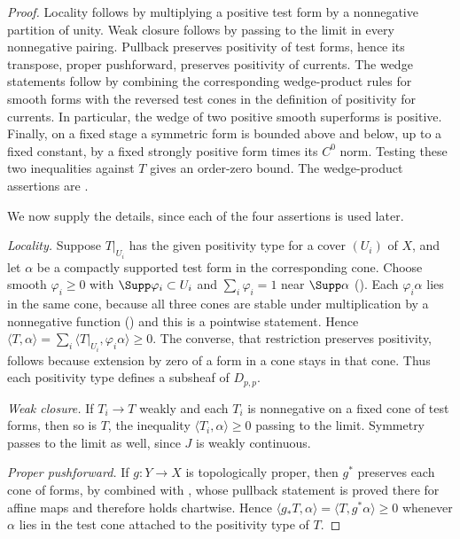 \begin{proof}
Locality follows by multiplying a positive test form by a nonnegative
partition of unity.  Weak closure follows by passing to the limit in every
nonnegative pairing.  Pullback preserves positivity of test forms, hence its
transpose, proper pushforward, preserves positivity of currents.  The wedge
statements follow by combining the corresponding wedge-product rules for
smooth forms with the reversed test cones in the definition of positivity for
currents.  In particular, the wedge of two positive smooth superforms is
positive.  Finally, on a fixed stage a symmetric form is bounded above
and below, up to a fixed constant, by a fixed strongly positive form times its
$C^0$ norm.  Testing these two inequalities against $T$ gives an order-zero
bound.  The wedge-product assertions are
\cite[Lemma~7.2.7 and Proposition~3.5.5]{CLD25}.

We now supply the details, since each of the four assertions is used later.

\emph{Locality.}  Suppose $T|_{U_i}$ has the given positivity type for a cover
$(U_i)$ of $X$, and let $\alpha$ be a compactly supported test form in the
corresponding cone.  Choose smooth $\varphi_i\ge0$ with
$\Supp\varphi_i\subset U_i$ and $\sum_i\varphi_i=1$ near $\Supp\alpha$
(\cite[Corollary~15.2.9]{CLD25}). Each $\varphi_i\alpha$ lies in the same
cone, because all three cones are stable under multiplication by a
nonnegative function () and this is a
pointwise statement.  Hence
$\langle T,\alpha\rangle=\sum_i\langle T|_{U_i},\varphi_i\alpha\rangle\ge0$.
The converse, that restriction preserves positivity, follows because
extension by zero of a form in a cone stays in that cone.  Thus each
positivity type defines a subsheaf of $D_{p,p}$.

\emph{Weak closure.}  If $T_i\to T$ weakly and each $T_i$ is nonnegative on a
fixed cone of test forms, then so is $T$, the inequality
$\langle T_i,\alpha\rangle\ge0$ passing to the limit.  Symmetry passes to the
limit as well, since $J$ is weakly continuous.

\emph{Proper pushforward.}  If $g:Y\to X$ is topologically proper, then
$g^*$ preserves each cone of forms, by
 combined with
, whose pullback statement is proved
there for affine maps and therefore holds chartwise.  Hence
$\langle g_*T,\alpha\rangle=\langle T,g^*\alpha\rangle\ge0$ whenever
$\alpha$ lies in the test cone attached to the positivity type of $T$.


\end{proof}

